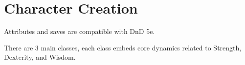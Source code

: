 \chapter{Character Creation}


Attributes and saves are compatible with DnD 5e.


There are 3 main classes, each class embeds core dynamics related to Strength, Dexterity, and Wisdom.




% 

% 

